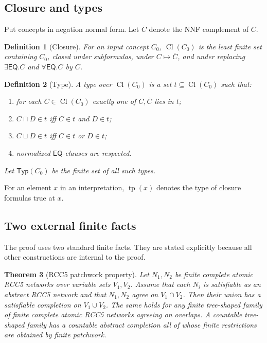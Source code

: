 \documentclass[11pt]{article}
\newtheorem{theorem}{Theorem}[section]
\newtheorem{definition}[theorem]{Definition}
\newcommand{\EQ}{\mathsf{EQ}}
\newcommand{\Cl}{\operatorname{Cl}}
\newcommand{\tp}{\operatorname{tp}}
\newcommand{\Typ}{\mathsf{Typ}}
\begin{document}
\subsection{Closure and types}

Put concepts in negation normal form.  Let $\overline C$ denote the NNF complement of $C$.

\begin{definition}[Closure]
For an input concept $C_0$, $\Cl(C_0)$ is the least finite set containing $C_0$, closed under subformulas, under $C\mapsto\overline C$, and under replacing $\exists\EQ.C$ and $\forall\EQ.C$ by $C$.
\end{definition}

\begin{definition}[Type]
A type over $\Cl(C_0)$ is a set $t\subseteq\Cl(C_0)$ such that:
\begin{enumerate}[label=(T\arabic*)]
\item for each $C\in\Cl(C_0)$ exactly one of $C,\overline C$ lies in $t$;
\item $C\sqcap D\in t$ iff $C\in t$ and $D\in t$;
\item $C\sqcup D\in t$ iff $C\in t$ or $D\in t$;
\item normalized $\EQ$-clauses are respected.
\end{enumerate}
Let $\Typ(C_0)$ be the finite set of all such types.
\end{definition}

For an element $x$ in an interpretation, $\tp(x)$ denotes the type of closure formulas true at $x$.

\subsection{Two external finite facts}

The proof uses two standard finite facts.  They are stated explicitly because all other constructions are internal to the proof.

\begin{theorem}[RCC5 patchwork property]\label{thm:patchwork}
Let $N_1,N_2$ be finite complete atomic RCC5 networks over variable sets $V_1,V_2$.  Assume that each $N_i$ is satisfiable as an abstract RCC5 network and that $N_1,N_2$ agree on $V_1\cap V_2$.  Then their union has a satisfiable completion on $V_1\cup V_2$.  The same holds for any finite tree-shaped family of finite complete atomic RCC5 networks agreeing on overlaps.  A countable tree-shaped family has a countable abstract completion all of whose finite restrictions are obtained by finite patchwork.
\end{theorem}
\end{document}
